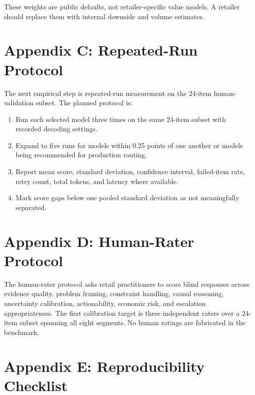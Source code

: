 \documentclass[11pt]{article}
\begin{document}
These weights are public defaults, not retailer-specific value models. A retailer should replace them with internal downside and volume estimates.

\section{Appendix C: Repeated-Run Protocol}

The next empirical step is repeated-run measurement on the 24-item human-validation subset. The planned protocol is:

\begin{enumerate}[leftmargin=*]
  \item Run each selected model three times on the same 24-item subset with recorded decoding settings.
  \item Expand to five runs for models within 0.25 points of one another or models being recommended for production routing.
  \item Report mean score, standard deviation, confidence interval, failed-item rate, retry count, total tokens, and latency where available.
  \item Mark score gaps below one pooled standard deviation as not meaningfully separated.
\end{enumerate}

\section{Appendix D: Human-Rater Protocol}

The human-rater protocol asks retail practitioners to score blind responses across evidence quality, problem framing, constraint handling, causal reasoning, uncertainty calibration, actionability, economic risk, and escalation appropriateness. The first calibration target is three independent raters over a 24-item subset spanning all eight segments. No human ratings are fabricated in the benchmark.

\section{Appendix E: Reproducibility Checklist}
\end{document}

